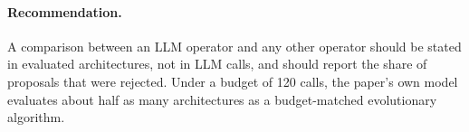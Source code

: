 \paragraph{Recommendation.} A comparison between an LLM operator and any other operator should be stated in evaluated architectures, not in LLM calls, and should report the share of proposals that were rejected. Under a budget of 120 calls, the paper's own model evaluates about half as many architectures as a budget-matched evolutionary algorithm.
